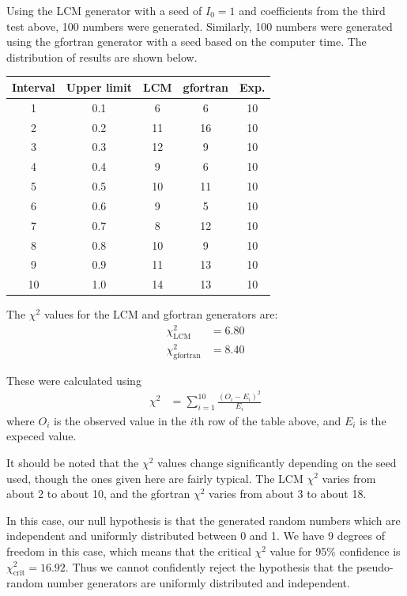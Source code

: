 \documentclass[twocolumn]{myarticle}
\begin{document}
Using the LCM generator with a seed of $ I_0 = 1 $ and coefficients from the third test above, 100 numbers were generated.
Similarly, 100 numbers were generated using the gfortran generator with a seed based on the computer time.
The distribution of results are shown below.

\bigskip
\begin{center}
    \begin{tabular}{ccccc}
        \toprule
        Interval & Upper limit & LCM & gfortran & Exp. \\
        \midrule
        1  & 0.1 &  6 &  6 & 10 \\
        2  & 0.2 & 11 & 16 & 10 \\
        3  & 0.3 & 12 &  9 & 10 \\
        4  & 0.4 &  9 &  6 & 10 \\
        5  & 0.5 & 10 & 11 & 10 \\
        6  & 0.6 &  9 &  5 & 10 \\
        7  & 0.7 &  8 & 12 & 10 \\
        8  & 0.8 & 10 &  9 & 10 \\
        9  & 0.9 & 11 & 13 & 10 \\
        10 & 1.0 & 14 & 13 & 10 \\
        \bottomrule
    \end{tabular}
\end{center}
\bigskip

The $ \chi^2 $ values for the LCM and gfortran generators are:
\begin{align}
    \chi_{\text{LCM}}^2 &= 6.80
    \\
    \chi_{\text{gfortran}}^2 &= 8.40
\end{align}

These were calculated using 
\begin{align}
    \chi^2 &= \sum_{i=1}^{10} \frac{(O_i - E_i)^2}{E_i}
\end{align}
where $ O_i $ is the observed value in the $ i $th row of the table above, and $ E_i $ is the expeced value. 

It should be noted that the $ \chi^2 $ values change significantly depending on the seed used, though the ones given here are fairly typical.
The LCM $ \chi^2 $ varies from about 2 to about 10, and the gfortran $ \chi^2 $ varies from about 3 to about 18.

In this case, our null hypothesis is that the generated random numbers which are independent and uniformly distributed between 0 and 1.
We have 9 degrees of freedom in this case, which means that the critical $ \chi^2 $ value for 95\% confidence is $ \chi_{\text{crit}}^2 = 16.92 $.
Thus we cannot confidently reject the hypothesis that the pseudo-random number generators are uniformly distributed and independent.
\end{document}

